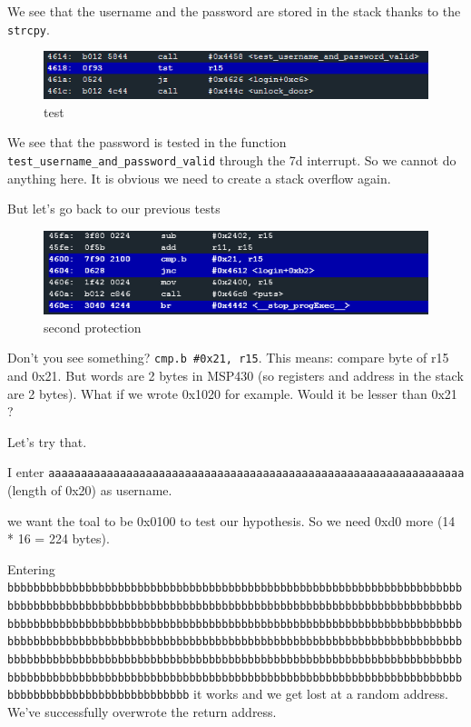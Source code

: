 \documentclass[a4paper,11pt]{article}
\begin{document}
We see that the username and the password are stored in the stack thanks
to the \texttt{strcpy}.

\begin{figure}[htbp]
\centering
\includegraphics{img/11_4.PNG}
\caption{test}
\end{figure}

We see that the password is tested in the function
\texttt{test\_username\_and\_password\_valid} through the 7d interrupt.
So we cannot do anything here. It is obvious we need to create a stack
overflow again.

But let's go back to our previous tests

\begin{figure}[htbp]
\centering
\includegraphics{img/11_2.PNG}
\caption{second protection}
\end{figure}

Don't you see something? \texttt{cmp.b \#0x21, r15}. This means: compare
byte of r15 and 0x21. But words are 2 bytes in MSP430 (so registers and
address in the stack are 2 bytes). What if we wrote 0x1020 for example.
Would it be lesser than 0x21 ?

Let's try that.

I enter
\texttt{aaaaaaaaaaaaaaaaaaaaaaaaaaaaaaaaaaaaaaaaaaaaaaaaaaaaaaaaaaaaaaaa}
(length of 0x20) as username.

we want the toal to be 0x0100 to test our hypothesis. So we need 0xd0
more (14 * 16 = 224 bytes).

Entering
\texttt{bbbbbbbbbbbbbbbbbbbbbbbbbbbbbbbbbbbbbbbbbbbbbbbbbbbbbbbbbbbbbbbbbbbbbbbbbbbbbbbbbbbbbbbbbbbbbbbbbbbbbbbbbbbbbbbbbbbbbbbbbbbbbbbbbbbbbbbbbbbbbbbbbbbbbbbbbbbbbbbbbbbbbbbbbbbbbbbbbbbbbbbbbbbbbbbbbbbbbbbbbbbbbbbbbbbbbbbbbbbbbbbbbbbbbbbbbbbbbbbbbbbbbbbbbbbbbbbbbbbbbbbbbbbbbbbbbbbbbbbbbbbbbbbbbbbbbbbbbbbbbbbbbbbbbbbbbbbbbbbbbbbbbbbbbbbbbbbbbbbbbbbbbbbbbbbbbbbbbbbbbbbbbbbbbbbbbbbbbbbbbbbbbbbbbbbbbbbbbbbbbbbbbbbbbbbbbbbbbbbbbbbbbbbbbbbbbbbbbbbbbbbbbbbb}
it works and we get lost at a random address. We've successfully
overwrote the return address.
\end{document}
